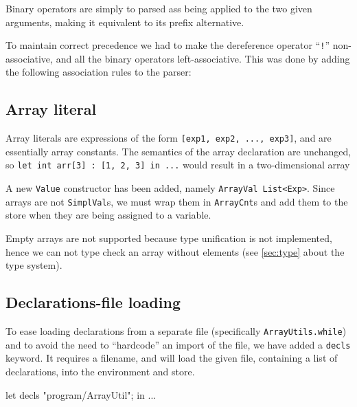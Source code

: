 \documentclass{article}
\begin{document}


Binary operators are simply to parsed ass being applied to the two
given arguments, making it equivalent to its prefix alternative.

To maintain correct precedence we had to make the dereference operator
``{\tt !}''  non-associative, and all the binary operators
left-associative. This was done by adding the following association
rules to the parser:
\begin{fs}
\end{fs}

\subsection{Array literal}
Array literals are expressions of the form {\tt [exp1, exp2, ..., exp3]}, and are essentially array constants. The semantics of the array declaration are unchanged, so {\tt let int arr[3] : [1, 2, 3] in ...} would result in a two-dimensional array

A new {\tt Value} constructor has been added, namely {\tt ArrayVal List<Exp>}. Since arrays are not {\tt SimplVal}s, we must wrap them in {\tt ArrayCnt}s and add them to the store when they are being assigned to a variable.

Empty arrays are not supported because type unification is not implemented, hence we can not type check an array without elements (see \ref{sec:type} about the type system).

\subsection{Declarations-file loading}
To ease loading declarations from a separate file (specifically {\tt ArrayUtils.while}) and to avoid the need to ``hardcode'' an import of the file, we have added a {\tt decls} keyword. It requires a filename, and will load the given file, containing a list of declarations, into the environment and store.

\begin{fs}
let decls "program/ArrayUtil"; in ...
\end{fs}
\end{document}
